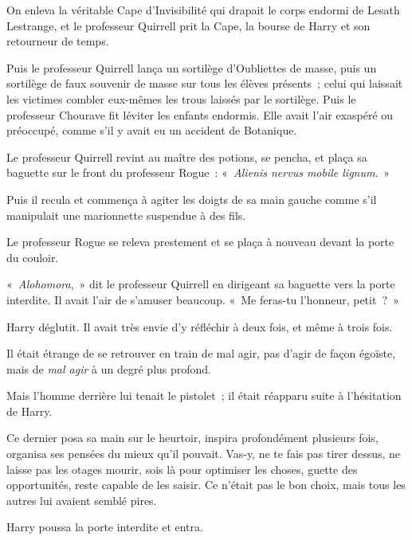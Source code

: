 On enleva la véritable Cape d'Invisibilité qui drapait le corps endormi de Lesath Lestrange, et le professeur Quirrell prit la Cape, la bourse de Harry et son retourneur de temps.

Puis le professeur Quirrell lança un sortilège d'Oubliettes de masse, puis un sortilège de faux souvenir de masse sur tous les élèves présents~; celui qui laissait les victimes combler eux-mêmes les trous laissés par le sortilège.
Puis le professeur Chourave fit léviter les enfants endormis.
Elle avait l'air exaspéré ou préoccupé, comme s'il y avait eu un accident de Botanique.

Le professeur Quirrell revint au maître des potions, se pencha, et plaça sa baguette sur le front du professeur Rogue~: «~\emph{Alienis nervus mobile lignum}.~»

Puis il recula et commença à agiter les doigts de sa main gauche comme s'il manipulait une marionnette suspendue à des fils.

Le professeur Rogue se releva prestement et se plaça à nouveau devant la porte du couloir.

«~\emph{Alohomora},~» dit le professeur Quirrell en dirigeant sa baguette vers la porte interdite.
Il avait l'air de s'amuser beaucoup.
«~Me feras-tu l'honneur, petit~?~»

Harry déglutit.
Il avait très envie d'y réfléchir à deux fois, et même à trois fois.

Il était étrange de se retrouver en train de mal agir, pas d'agir de façon égoïste, mais de \emph{mal agir} à un degré plus profond.

Mais l'homme derrière lui tenait le pistolet~; il était réapparu suite à l'hésitation de Harry.

Ce dernier posa sa main sur le heurtoir, inspira profondément plusieurs fois, organisa ses pensées du mieux qu'il pouvait.
Vas-y, ne te fais pas tirer dessus, ne laisse pas les otages mourir, sois là pour optimiser les choses, guette des opportunités, reste capable de les saisir.
Ce n'était pas le bon choix, mais tous les autres lui avaient semblé pires.

Harry poussa la porte interdite et entra.
